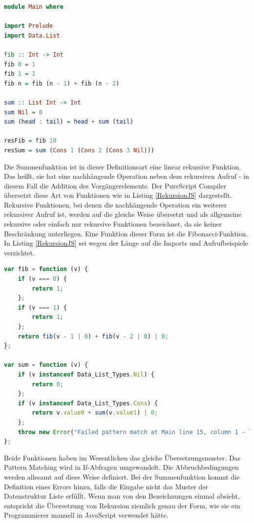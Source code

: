 \documentclass[
12pt,
ngerman,
oneside]
{scrbook} %
\begin{document}
\begin{lstlisting}[language=purescript, style=numbered-and-boxed, caption=Rekursion in PureScript, label=RekursionPS]
module Main where

import Prelude
import Data.List

fib :: Int -> Int
fib 0 = 1
fib 1 = 1
fib n = fib (n - 1) + fib (n - 2)

sum :: List Int -> Int
sum Nil = 0
sum (head : tail) = head + sum (tail)

resFib = fib 10
resSum = sum (Cons 1 (Cons 2 (Cons 3 Nil)))
\end{lstlisting}

Die Summenfunktion ist in dieser Definitionsart eine linear rekursive Funktion. Das heißt, sie hat eine nachhängende Operation neben dem rekursiven Aufruf - in diesem Fall die Addition des Vorgängerelements. Der PureScript Compiler übersetzt diese Art von Funktionen wie in Listing \ref{RekursionJS} dargestellt. Rekursive Funktionen, bei denen die nachhängende Operation ein weiterer rekursiver Aufruf ist, werden auf die gleiche Weise übersetzt und als allgemeine rekursive oder einfach nur rekursive Funktionen bezeichnet, da sie keiner Beschränkung unterliegen. Eine Funktion dieser Form ist die Fibonacci-Funktion. In Listing \ref{RekursionJS} sei wegen der Länge auf die Imports und Aufrufbeispiele verzichtet.

\begin{lstlisting}[language=javascript, style=numbered-and-boxed, caption= Übersetzung von Rekursion nach JavaScript, label=RekursionJS]
var fib = function (v) {
	if (v === 0) {
		return 1;
	};
	if (v === 1) {
		return 1;
	};
	return fib(v - 1 | 0) + fib(v - 2 | 0) | 0;
};

var sum = function (v) {
	if (v instanceof Data_List_Types.Nil) {
		return 0;
	};
	if (v instanceof Data_List_Types.Cons) {
		return v.value0 + sum(v.value1) | 0;
	};
	throw new Error("Failed pattern match at Main line 15, column 1 - line 15, column 23: " + [ v.constructor.name ]);
};
\end{lstlisting}

Beide Funktionen haben im Wesentlichen das gleiche Übersetzungsmuster. Das Pattern Matching wird in If-Abfragen umgewandelt. Die Abbruchbedingungen werden allesamt auf diese Weise definiert. Bei der Summenfunktion kommt die Definition eines Errors hinzu, falls die Eingabe nicht das Muster der Datenstruktur Liste  erfüllt. Wenn man von den Bezeichnungen einmal absieht, entspricht die Übersetzung von Rekursion ziemlich genau der Form, wie sie ein Programmierer manuell in JavaScript verwendet hätte.
\end{document}
